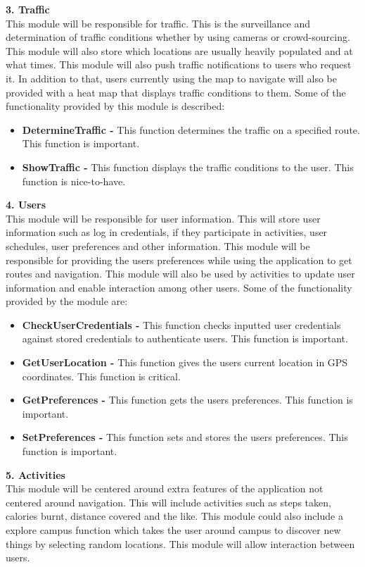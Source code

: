 \documentclass[a4paper,12pt]{article}
\begin{document}
\textbf{3. Traffic}\\
This module will be responsible for traffic. This is the surveillance and determination of traffic conditions whether by using cameras or crowd-sourcing. This module will also store which locations are usually heavily populated and at what times. This module will also push traffic notifications to users who request it. In addition to that, users currently using the map to navigate will also be provided with a heat map that displays traffic conditions to them. Some of the functionality provided by this module is described:
\begin{itemize}
\item \textbf{DetermineTraffic -} This function determines the traffic on a specified route. This function is important.
\item \textbf{ShowTraffic -} This function displays the traffic conditions to the user. This function is nice-to-have.
\end{itemize}

\textbf{4. Users}\\
This module will be responsible for user information. This will store user information such as log in credentials, if they participate in activities, user schedules, user preferences and other information. This module will be responsible for providing the users preferences while using the application to get routes and navigation. This module will also be used by activities to update user information and enable interaction among other users. Some of the functionality provided by the module are: 
\begin{itemize}
\item \textbf{CheckUserCredentials -} This function checks inputted user credentials against stored credentials to authenticate users. This function is important.
\item \textbf{GetUserLocation -} This function gives the users current location in GPS coordinates. This function is critical.
\item \textbf{GetPreferences -} This function gets the users preferences. This function is important.
\item \textbf{SetPreferences -} This function sets and stores the users preferences. This function is important.
\end{itemize}

\textbf{5. Activities}\\
This module will be centered around extra features of the application not centered around navigation. This will include activities such as steps taken, calories burnt, distance covered and the like. This module could also include a explore campus function which takes the user around campus to discover new things by selecting random locations. This module will allow interaction between users.
 
\end{document}
